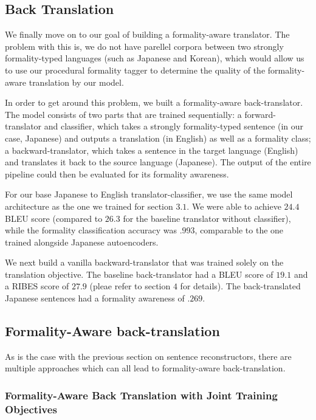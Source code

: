 \documentclass[11pt]{article}
\begin{document}
\subsection{Back Translation}

We finally move on to our goal of building a formality-aware translator. The problem with this is, we do not have parellel corpora between two strongly formality-typed languages (such as Japanese and Korean), which would allow us to use our procedural formality tagger to determine the quality of the formality-aware translation by our model. 

In order to get around this problem, we built a formality-aware back-translator. The model consists of two parts that are trained sequentially: a forward-translator and classifier, which takes a strongly formality-typed sentence (in our case, Japanese) and outputs a translation (in English) as well as a formality class; a backward-translator, which takes a sentence in the target language (English) and translates it back to the source language (Japanese). The output of the entire pipeline could then be evaluated for its formality awareness.

For our base Japanese to English translator-classifier, we use the same model architecture as the one we trained for section $3.1$. We were able to achieve $24.4$ BLEU score (compared to $26.3$ for the baseline translator without classifier), while the formality classification accuracy was $.993$, comparable to the one trained alongside Japanese autoencoders. 

We next build a vanilla backward-translator that was trained solely on the translation objective. The baseline back-translator had a BLEU score of $19.1$ and a RIBES score of $27.9$ (pleae refer to section $4$ for details). The back-translated Japanese sentences had a formality awareness of $.269$.

\subsection{Formality-Aware back-translation}

As is the case with the previous section on sentence reconstructors, there are multiple approaches which can all lead to formality-aware back-translation.

\subsubsection{Formality-Aware Back Translation with Joint Training Objectives}
\end{document}
